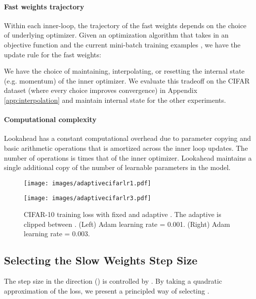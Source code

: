\documentclass{article}
\begin{document}
\paragraph{Fast weights trajectory} Within each inner-loop, the trajectory of the fast weights depends on the choice of underlying optimizer. Given an optimization algorithm  that takes in an objective function  and the current mini-batch training examples , we have the update rule for the fast weights:

We have the choice of maintaining, interpolating, or resetting the internal state (e.g. momentum) of the inner optimizer. We evaluate this tradeoff on the CIFAR dataset (where every choice improves convergence) in Appendix \ref{app:interpolation} and maintain internal state for the other experiments. 




\paragraph{Computational complexity} Lookahead has a constant computational overhead due to parameter copying and basic arithmetic operations that is amortized across the  inner loop updates. The number of operations is  times that of the inner optimizer. Lookahead maintains a single additional copy of the number of learnable parameters in the model.

\begin{figure}
    \centering
    \begin{minipage}{0.49 \linewidth}
    \texttt{[image: images/adaptivecifarlr1.pdf]}
    \end{minipage} \hfill
    \begin{minipage}{0.49 \linewidth}
    \texttt{[image: images/adaptivecifarlr3.pdf]}
    \end{minipage}
    \caption{CIFAR-10 training loss with fixed and adaptive . The adaptive  is clipped between . (Left) Adam learning rate = 0.001.  (Right) Adam learning rate = 0.003.} 
    \label{fig:adaptivealpha}
\end{figure}

\subsection{Selecting the Slow Weights Step Size}

The step size in the direction () is controlled by . By taking a quadratic approximation of the loss, we present a principled way of selecting . 
\end{document}
